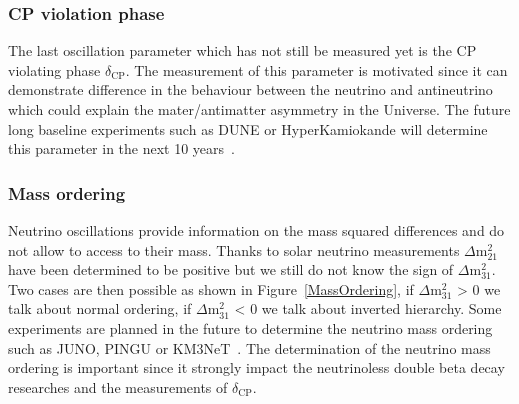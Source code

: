 \documentclass[main.tex]{subfiles}
\begin{document}

\subsubsection{CP violation phase}


\NI The last oscillation parameter which has not still be measured yet is the CP violating phase $\delta_\text{CP}$. The measurement of this parameter is motivated since it can demonstrate difference in the behaviour between the neutrino and antineutrino which could explain the mater/antimatter asymmetry in the Universe. The future long baseline experiments such as DUNE or HyperKamiokande will determine this parameter in the next 10 years~\cite{DUNE,HK}. 


\subsubsection{Mass ordering}


\NI Neutrino oscillations provide information on the mass squared differences and do not allow to access to their mass. Thanks to solar neutrino measurements $\Delta\text{m}^\text{2}_\text{21}$ have been determined to be positive but we still do not know the sign of $\Delta\text{m}^\text{2}_\text{31}$. Two cases are then possible as shown in Figure~\ref{MassOrdering}, if $\Delta\text{m}^\text{2}_\text{31}$ > 0 we talk about normal ordering, if $\Delta\text{m}^\text{2}_\text{31}$ < 0 we talk about inverted hierarchy. Some experiments are planned in the future to determine the neutrino mass ordering such as JUNO, PINGU or KM3NeT~\cite{JUNO,PINGU,KM3NeT}. The determination of the neutrino mass ordering is important since it strongly impact the neutrinoless double beta decay researches and the measurements of $\delta_\text{CP}$.
\end{document}
